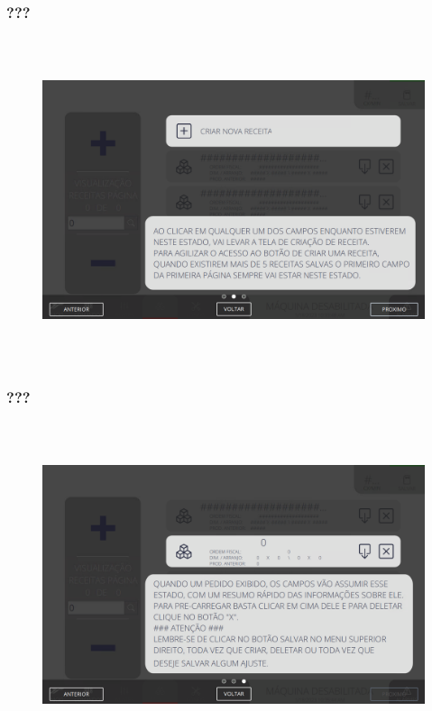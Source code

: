 \newpage
\thispagestyle{fancy}
\vspace*{\fill}
\subsubsection{\small{???}}
\begin{figure}[h]
  \centering
  \includegraphics[width=576px,height=360px]{src/imagesFlexo/10-orders/01-visualization/e-2.png}
   \label{}
\end{figure}
\vspace*{\fill}

\newpage
\thispagestyle{fancy}
\vspace*{\fill}
\subsubsection{\small{???}}
\begin{figure}[h]
  \centering
  \includegraphics[width=576px,height=360px]{src/imagesFlexo/10-orders/01-visualization/e-3.png}
   \label{}
\end{figure}
\vspace*{\fill}


